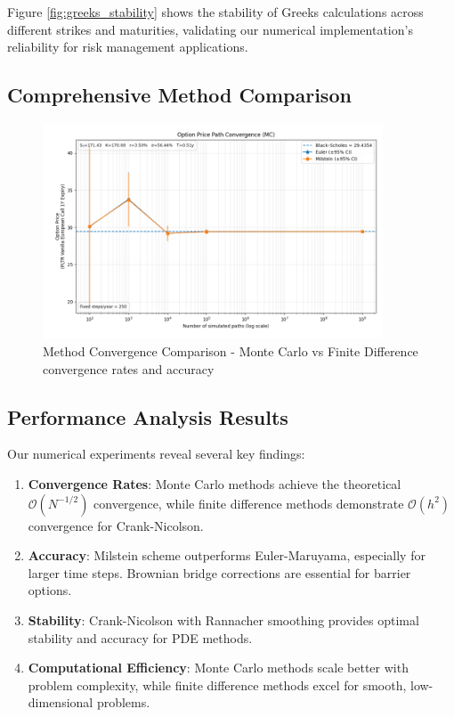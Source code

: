 \documentclass[11pt,a4paper]{article}
\begin{document}
Figure \ref{fig:greeks_stability} shows the stability of Greeks calculations across different strikes and maturities, validating our numerical implementation's reliability for risk management applications.

\subsection{Comprehensive Method Comparison}

\begin{figure}[H]
\centering
\includegraphics[width=0.9\textwidth]{../charts/Constant Vol Charts/mc_price_convergence.png}
\caption{Method Convergence Comparison - Monte Carlo vs Finite Difference convergence rates and accuracy}
\label{fig:method_comparison}
\end{figure}

\subsection{Performance Analysis Results}

Our numerical experiments reveal several key findings:

\begin{enumerate}
\item \textbf{Convergence Rates}: Monte Carlo methods achieve the theoretical $\mathcal{O}(N^{-1/2})$ convergence, while finite difference methods demonstrate $\mathcal{O}(h^2)$ convergence for Crank-Nicolson.

\item \textbf{Accuracy}: Milstein scheme outperforms Euler-Maruyama, especially for larger time steps. Brownian bridge corrections are essential for barrier options.

\item \textbf{Stability}: Crank-Nicolson with Rannacher smoothing provides optimal stability and accuracy for PDE methods.

\item \textbf{Computational Efficiency}: Monte Carlo methods scale better with problem complexity, while finite difference methods excel for smooth, low-dimensional problems.
\end{enumerate}
\end{document}
